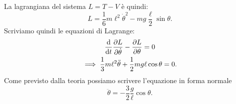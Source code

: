 \begin{example}
    La lagrangiana del sistema $L = T - V$ è quindi:
    \begin{equation*}
        L = \frac{1}{6}m\ell^2\dot{\theta}^2 - mg\frac{\ell}{2}\sin\theta.
    \end{equation*}
    Scriviamo quindi le equazioni di Lagrange:
    \begin{gather*}
        \dv{t}\pdv{L}{\dot{\theta}} - \pdv{L}{\theta} = 0 \\
        \implies \frac{1}{3}m\ell^2\ddot{\theta} + \frac{1}{2}mg\ell\cos\theta = 0.
    \end{gather*}
    Come previsto dalla teoria possiamo scrivere l'equazione in forma normale
    \begin{equation*}
        \ddot{\theta} = -\frac{3}{2}\frac{g}{\ell}\cos\theta.
    \end{equation*}
\end{example}



